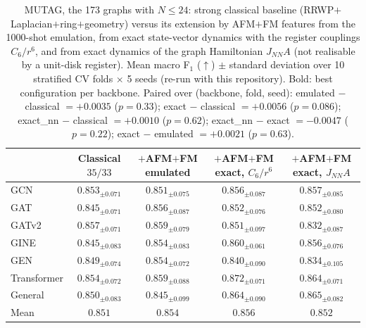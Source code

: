 \begin{table}[t]
\caption{%
  MUTAG, the 173 graphs with $N \le 24$: strong classical baseline (RRWP${+}$Laplacian${+}$ring${+}$geometry) versus its extension by AFM${+}$FM features from the 1000-shot
  emulation, from exact state-vector dynamics with the register couplings $C_6/r^6$, and
  from exact dynamics of the graph Hamiltonian $J_{NN} A$ (not realisable by a unit-disk
  register). Mean macro F$_1$ ($\uparrow$) $\pm$ standard deviation over 10 stratified
  CV folds $\times$ 5 seeds (re-run with this repository). Bold: best configuration per backbone.
  Paired over (backbone, fold, seed): emulated ${-}$ classical $= +0.0035$ ($p=0.33$); exact ${-}$ classical $= +0.0056$ ($p=0.086$); exact_nn ${-}$ classical $= +0.0010$ ($p=0.62$); exact_nn ${-}$ exact $= -0.0047$ ($p=0.22$); exact ${-}$ emulated $= +0.0021$ ($p=0.63$).
}
\label{tab:mutag-exact-non-unit-disk}
\centering
\small
\setlength{\tabcolsep}{4pt}
\begin{tabular}{l c c c c}
\toprule
 & \shortstack{Classical\\ \scriptsize $35/33$} & \shortstack{${+}$AFM${+}$FM\\ \scriptsize emulated} & \shortstack{${+}$AFM${+}$FM\\ \scriptsize exact, $C_6/r^6$} & \shortstack{${+}$AFM${+}$FM\\ \scriptsize exact, $J_{NN}A$} \\
\midrule
  GCN          & $0.853{_{\pm 0.071}}$ & $0.851{_{\pm 0.075}}$ & $0.856{_{\pm 0.087}}$ & $\mathbf{0.857}{_{\pm 0.085}}$ \\
  GAT          & $0.845{_{\pm 0.071}}$ & $\mathbf{0.856}{_{\pm 0.087}}$ & $0.852{_{\pm 0.076}}$ & $0.852{_{\pm 0.080}}$ \\
  GATv2        & $0.857{_{\pm 0.071}}$ & $\mathbf{0.859}{_{\pm 0.079}}$ & $0.851{_{\pm 0.097}}$ & $0.832{_{\pm 0.087}}$ \\
  GINE         & $0.845{_{\pm 0.083}}$ & $0.854{_{\pm 0.083}}$ & $\mathbf{0.860}{_{\pm 0.061}}$ & $0.856{_{\pm 0.076}}$ \\
  GEN          & $0.849{_{\pm 0.074}}$ & $\mathbf{0.854}{_{\pm 0.072}}$ & $0.840{_{\pm 0.090}}$ & $0.834{_{\pm 0.105}}$ \\
  Transformer  & $0.854{_{\pm 0.072}}$ & $0.859{_{\pm 0.088}}$ & $\mathbf{0.872}{_{\pm 0.071}}$ & $0.864{_{\pm 0.071}}$ \\
  General      & $0.850{_{\pm 0.083}}$ & $0.845{_{\pm 0.099}}$ & $0.864{_{\pm 0.090}}$ & $\mathbf{0.865}{_{\pm 0.082}}$ \\
\midrule
  Mean & $0.851$ & $0.854$ & $0.856$ & $0.852$ \\
\bottomrule
\end{tabular}
\end{table}
